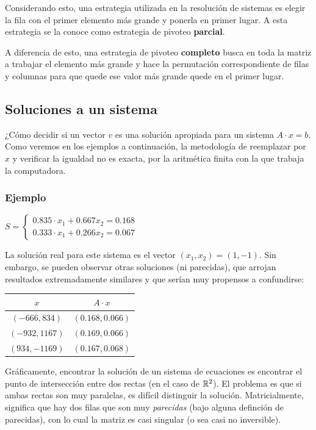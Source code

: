 \documentclass[]{article}
\begin{document}
Considerando esto, una estrategia utilizada en la resolución de sistemas es elegir la fila con el primer elemento más grande y ponerla en primer lugar. A esta estrategia se la conoce como estrategia de pivoteo \textbf{parcial}.


A diferencia de esto, una estrategia de pivoteo \textbf{completo} busca en toda la matriz a trabajar el elemento más grande y hace la permutación correspondiente de filas y columnas para que quede ese valor más grande quede en el primer lugar.


\subsection{Soluciones a un sistema}
¿Cómo decidir si un vector $v$ es una solución apropiada para un sistema $A\cdot x = b$. Como veremos en los ejemplos a continuación, la metodología de reemplazar por $x$ y verificar la igualdad no es exacta, por la aritmética finita con la que trabaja la computadora.

\subsubsection{Ejemplo}
$S=\begin{cases}
	0.835\cdot x_1 + 0.667 x_2 = 0.168\\
	0.333\cdot x_1 + 0.266 x_2 = 0.067
\end{cases}$

La solución real para este sistema es el vector $(x_1,x_2) = (1,-1)$. Sin embargo, se pueden observar otras soluciones (ni parecidas), que arrojan resultados extremadamente similares y que serían muy propensos a confundirse:

\begin{table}[h]\centering
	\begin{tabular}{|c|c|}
		\hline
		$x$				 & $A\cdot x$	   \\ \hline
		$(-666,834)$	 & $(0.168,0.066)$ \\
		$(-932,1167)$ 	 & $(0.169,0.066)$ \\
		$(934,-1169)$ 	 & $(0.167,0.068)$ \\
		\hline
	\end{tabular}
\end{table}

Gráficamente, encontrar la solución de un sistema de ecuaciones es encontrar el punto de intersección entre dos rectas (en el caso de $\mathbb{R}^2$). El problema es que si ambas rectas son muy paralelas, es difícil distinguir la solución. Matricialmente, significa que hay dos filas que son muy \emph{parecidas} (bajo alguna definción de parecidas), con lo cual la matriz es casi singular (o sea casi no inversible).
\end{document}
